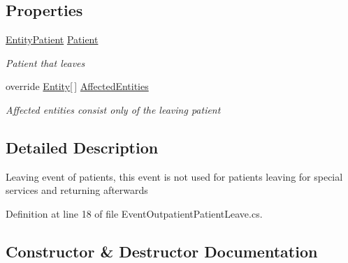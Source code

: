 \subsection*{Properties}
\begin{DoxyCompactItemize}
\item 
\hyperlink{class_general_health_care_elements_1_1_entities_1_1_entity_patient}{Entity\+Patient} \hyperlink{class_general_health_care_elements_1_1_department_models_1_1_outpatient_1_1_event_outpatient_patient_leave_a3428aa5af028749eec0cc37e5b029da2}{Patient}
\begin{DoxyCompactList}\small\item\em Patient that leaves \end{DoxyCompactList}\item 
override \hyperlink{class_simulation_core_1_1_h_c_c_m_elements_1_1_entity}{Entity}\mbox{[}$\,$\mbox{]} \hyperlink{class_general_health_care_elements_1_1_department_models_1_1_outpatient_1_1_event_outpatient_patient_leave_ad646f37a4045c8654ed698d11aa7d0be}{Affected\+Entities}
\begin{DoxyCompactList}\small\item\em Affected entities consist only of the leaving patient \end{DoxyCompactList}\end{DoxyCompactItemize}


\subsection{Detailed Description}
Leaving event of patients, this event is not used for patients leaving for special services and returning afterwards 



Definition at line 18 of file Event\+Outpatient\+Patient\+Leave.\+cs.



\subsection{Constructor \& Destructor Documentation}
